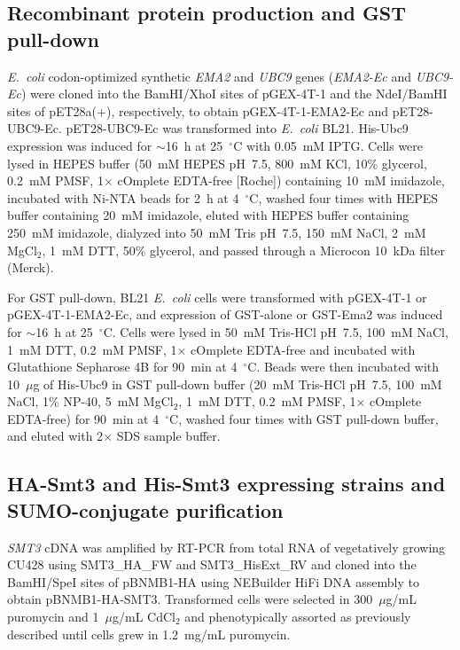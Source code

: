\documentclass[11pt,a4paper]{article}
\begin{document}
\subsection{Recombinant protein production and GST pull-down}
\textit{E.~coli} codon-optimized synthetic \textit{EMA2} and \textit{UBC9} genes (\textit{EMA2-Ec} and \textit{UBC9-Ec}) were cloned into the BamHI/XhoI sites of pGEX-4T-1 and the NdeI/BamHI sites of pET28a(+), respectively, to obtain pGEX-4T-1-EMA2-Ec and pET28-UBC9-Ec. pET28-UBC9-Ec was transformed into \textit{E.~coli} BL21. His-Ubc9 expression was induced for $\sim$16~h at 25~$^\circ$C with 0.05~mM IPTG. Cells were lysed in HEPES buffer (50~mM HEPES pH~7.5, 800~mM KCl, 10\% glycerol, 0.2~mM PMSF, 1$\times$ cOmplete EDTA-free [Roche]) containing 10~mM imidazole, incubated with Ni-NTA beads for 2~h at 4~$^\circ$C, washed four times with HEPES buffer containing 20~mM imidazole, eluted with HEPES buffer containing 250~mM imidazole, dialyzed into 50~mM Tris pH~7.5, 150~mM NaCl, 2~mM MgCl$_2$, 1~mM DTT, 50\% glycerol, and passed through a Microcon 10~kDa filter (Merck).

For GST pull-down, BL21 \textit{E.~coli} cells were transformed with pGEX-4T-1 or pGEX-4T-1-EMA2-Ec, and expression of GST-alone or GST-Ema2 was induced for $\sim$16~h at 25~$^\circ$C. Cells were lysed in 50~mM Tris-HCl pH~7.5, 100~mM NaCl, 1~mM DTT, 0.2~mM PMSF, 1$\times$ cOmplete EDTA-free and incubated with Glutathione Sepharose 4B for 90~min at 4~$^\circ$C. Beads were then incubated with 10~$\mu$g of His-Ubc9 in GST pull-down buffer (20~mM Tris-HCl pH~7.5, 100~mM NaCl, 1\% NP-40, 5~mM MgCl$_2$, 1~mM DTT, 0.2~mM PMSF, 1$\times$ cOmplete EDTA-free) for 90~min at 4~$^\circ$C, washed four times with GST pull-down buffer, and eluted with 2$\times$ SDS sample buffer.

\subsection{HA-Smt3 and His-Smt3 expressing strains and SUMO-conjugate purification}
\textit{SMT3} cDNA was amplified by RT-PCR from total RNA of vegetatively growing CU428 using SMT3\_HA\_FW and SMT3\_HisExt\_RV and cloned into the BamHI/SpeI sites of pBNMB1-HA using NEBuilder HiFi DNA assembly to obtain pBNMB1-HA-SMT3. Transformed cells were selected in 300~$\mu$g/mL puromycin and 1~$\mu$g/mL CdCl$_2$ and phenotypically assorted as previously described \citep{Hamilton2000} until cells grew in 1.2~mg/mL puromycin.
\end{document}
